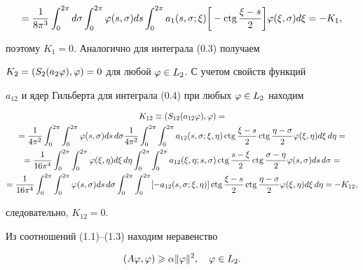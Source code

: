 \begin{pf}
\begin{gather*}
=\frac{1}{8\pi^3}\int_{0}^{2\pi}d\si \int_0^{2\pi}\vp(s,\si)ds


\int_0^{2\pi}a_1(s,\si;\xi)\bigg[-\ctg\frac{\xi-s}{2}\bigg]


\vp(\xi,\sigma)d\xi = -K_1,


\end{gather*}


поэтому $K_1=0$. Аналогично для интеграла (0.3) получаем 


$K_2=(S_2(a_2\varphi),\varphi)=0$ для любой $\varphi \in L_2$. С учетом свойств функций 


$a_{12}$ и ядер Гильберта для интеграла (0.4) при любых $\varphi \in L_2$ находим


\begin{gather*}


K_{12} \equiv (S_{12}(a_{12}\vp),\vp) = \\


%


=\frac{1}{4\pi^2}\int_{0}^{2\pi}\int_0^{2\pi}\vp(s,\si)ds\,d\si


\frac{1}{4\pi^2}\int_0^{2\pi}\int_0^{2\pi} a_{12}(s,\si;\xi,\eta)


\ctg\frac{\xi-s}{2}\ctg\frac{\eta-\si}{2}\vp(\xi,\eta)d\xi\,d\eta= \\


%


=\frac{1}{16\pi^4}\int_0^{2\pi}\int_{0}^{2\pi} \vp (\xi,\eta)d\xi\,d\eta


\int_0^{2\pi}\int_0^{2\pi} a_{12}(\xi,\eta;s,\si)\ctg\frac{s-\xi}{2}


\ctg\frac{\si-\eta}{2}\vp(s,\si)ds\, d\si = \\


%


= \frac{1}{16\pi^4} \int_0^{2\pi} \int_0^{2\pi} \vp(s,\si) ds\,d\si


\int_0^{2\pi}\int_0^{2\pi} [-a_{12}(s,\si;\xi,\eta)]\ctg\frac{\xi-s}{2}


\ctg\frac{\eta-\si}{2}\vp(\xi,\eta)d\xi\,d\eta = -K_{12},


\end{gather*}


следовательно, $K_{12} = 0$.





Из соотношений (1.1)--(1.3) находим неравенство


\begin{equation}


(A\vp,\vp) \gea \alpha\|\vp\|^{2},\quad \vp \in L_2.



\end{equation}
\end{pf}
